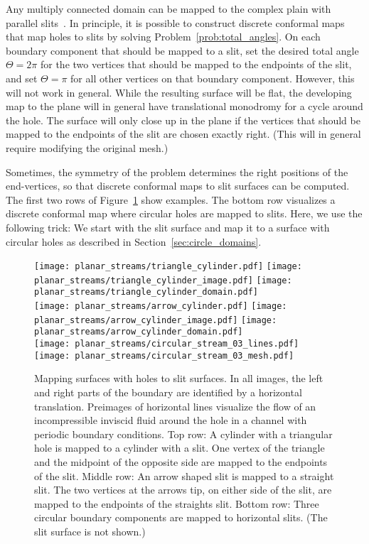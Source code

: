 \documentclass[Thesis]{subfiles}
\begin{document}
Any multiply connected domain can be mapped to the complex plain with
parallel slits~\cite{nehari1952conformal}. In principle, it is
possible to construct discrete conformal maps that map holes to slits
by solving Problem~\ref{prob:total_angles}. On each boundary component
that should be mapped to a slit, set the desired total angle
$\Theta=2\pi$ for the two vertices that should be mapped to the
endpoints of the slit, and set $\Theta=\pi$ for all other vertices on
that boundary component. However, this will not work in general. While
the resulting surface will be flat, the developing map to the plane
will in general have translational monodromy for a cycle around the
hole. The surface will only close up in the plane if the vertices that
should be mapped to the endpoints of the slit are chosen exactly
right. (This will in general require modifying the original mesh.)

Sometimes, the symmetry of the problem determines the right positions
of the end-vertices, so that discrete conformal maps to slit surfaces
can be computed. The first two rows of Figure~\ref{fig:fluid_flows}
show examples. The bottom row visualizes a discrete conformal map
where circular holes are mapped to slits. Here, we use the following
trick: We start with the slit surface and map it to a surface with
circular holes as described in Section~\ref{sec:circle_domains}.
\begin{figure}
	\texttt{[image: planar\_streams/triangle\_cylinder.pdf]}
	\hfill
	\texttt{[image: planar\_streams/triangle\_cylinder\_image.pdf]}
        \hfill	
	\texttt{[image: planar\_streams/triangle\_cylinder\_domain.pdf]}\\
	\texttt{[image: planar\_streams/arrow\_cylinder.pdf]}
	\textwidth
	\texttt{[image: planar\_streams/arrow\_cylinder\_image.pdf]}\hfill
	\textwidth
	\texttt{[image: planar\_streams/arrow\_cylinder\_domain.pdf]}\\
	\texttt{[image: planar\_streams/circular\_stream\_03\_lines.pdf]}
	\texttt{[image: planar\_streams/circular\_stream\_03\_mesh.pdf]}
        \caption{Mapping surfaces with holes to slit surfaces. In all
          images, the left and right parts of the boundary are
          identified by a horizontal translation. Preimages of
          horizontal lines visualize the flow of an incompressible
          inviscid fluid around the hole in a channel with periodic
          boundary conditions. Top row: A
          cylinder with a triangular hole is mapped to a cylinder with
          a slit. One vertex of the triangle and the midpoint of the
          opposite side are mapped to the endpoints of the
          slit. Middle row: An arrow shaped slit is mapped to a
          straight slit. The two vertices at the arrows tip, on either
          side of the slit, are mapped to the endpoints of the
          straights slit. Bottom row: Three circular boundary
          components are mapped to horizontal slits. (The slit surface
          is not shown.)}
\label{fig:fluid_flows}
\end{figure}
\end{document}
